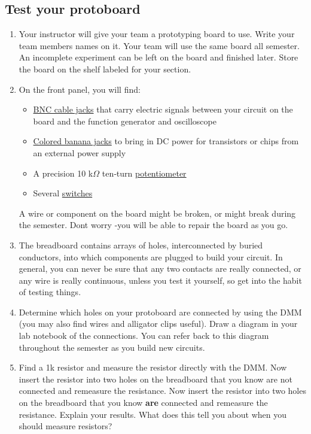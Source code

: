 \documentclass[10pt]{PhysLab1C} %
\begin{document}
\subsection{Test your protoboard}

\begin{enumerate}
\def\labelenumi{\arabic{enumi}.}
\item
  Your instructor will give your team a prototyping board to use. Write
  your team member\textquotesingle s names on it. Your team will use the
  same board all semester. An incomplete experiment can be left on the
  board and finished later. Store the board on the shelf labeled for
  your section.
\item
  On the front panel, you will find:

  \begin{itemize}
  \item
    \underline{BNC cable jacks} that carry electric signals between your
    circuit on the board and the function generator and oscilloscope
  \end{itemize}

  \begin{itemize}
  \item
    \underline{Colored banana jacks} to bring in DC power for transistors or
    chips from an external power supply
  \end{itemize}

  \begin{itemize}
  \item
    A precision 10 k$\Omega$ ten‑turn \underline{potentiometer}
  \end{itemize}

  \begin{itemize}
  \item
    Several \underline{switches}
  \end{itemize}

  A wire or component on the board might be broken, or might break
  during the semester. Don\textquotesingle t worry -you will be able to
  repair the board as you go.
\item
  The breadboard contains arrays of holes, interconnected by buried
  conductors, into which components are plugged to build your circuit.
  In general, you can never be sure that any two contacts are really
  connected, or any wire is really continuous, unless you test it
  yourself, so get into the habit of testing things.
\item
  Determine which holes on your protoboard are connected by using the
  DMM (you may also find wires and alligator clips useful). Draw a
  diagram in your lab notebook of the connections. You can refer back to
  this diagram throughout the semester as you build new circuits.
\item
  Find a 1k resistor and measure the resistor directly with the DMM. Now
  insert the resistor into two holes on the breadboard that you know are
  not connected and remeasure the resistance. Now insert the resistor
  into two holes on the breadboard that you know \textbf{are} connected
  and remeasure the resistance. Explain your results. What does this
  tell you about when you should measure resistors?
\end{enumerate}
\end{document}

